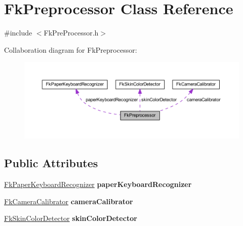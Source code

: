 \hypertarget{class_fk_preprocessor}{}\section{Fk\+Preprocessor Class Reference}
\label{class_fk_preprocessor}


{\ttfamily \#include $<$Fk\+Pre\+Processor.\+h$>$}



Collaboration diagram for Fk\+Preprocessor\+:\nopagebreak
\begin{figure}[H]
\begin{center}
\leavevmode
\includegraphics[width=350pt]{class_fk_preprocessor__coll__graph}
\end{center}
\end{figure}
\subsection*{Public Attributes}
\begin{DoxyCompactItemize}
\item 
\hypertarget{class_fk_preprocessor_ab0cc51a9e36102c928e5a1a62b4204cb}{}\hyperlink{class_fk_paper_keyboard_recognizer}{Fk\+Paper\+Keyboard\+Recognizer} {\bfseries paper\+Keyboard\+Recognizer}\label{class_fk_preprocessor_ab0cc51a9e36102c928e5a1a62b4204cb}

\item 
\hypertarget{class_fk_preprocessor_aae22f7fe1260f67e5ea54e6f9ecf345f}{}\hyperlink{class_fk_camera_calibrator}{Fk\+Camera\+Calibrator} {\bfseries camera\+Calibrator}\label{class_fk_preprocessor_aae22f7fe1260f67e5ea54e6f9ecf345f}

\item 
\hypertarget{class_fk_preprocessor_a5bc133f42b182228ad50926a4da64a1e}{}\hyperlink{class_fk_skin_color_detector}{Fk\+Skin\+Color\+Detector} {\bfseries skin\+Color\+Detector}\label{class_fk_preprocessor_a5bc133f42b182228ad50926a4da64a1e}

\end{DoxyCompactItemize}


